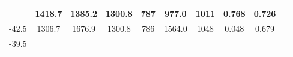 \documentclass[a4paper,12pt]{article}
\begin{document}
\begin{longtable}{
     |
%    
    c|
%    
    c|
%    
    c|
%    
    c|
%    
    c|
%    
    c|
%    
    c|
%    
    c|
%    
    c|
%    
    c|
%    
    }
%        
        & 1418.7
%        

%        

%        
        & 1385.2
%        

%        

%        
        & 1300.8
%        

%        

%        
        & 787
%        

%        

%        
        & 977.0
%        

%        

%        
        & 1011
%        

%        

%        
        & 0.768
%        

%        

%        
        & 0.726
%        

%        
        \\
        \hline

        

%        

%        
        -42.5
%        

%        

%        
        & 1306.7
%        

%        

%        
        & 1676.9
%        

%        

%        
        & 1300.8
%        

%        

%        
        & 786
%        

%        

%        
        & 1564.0
%        

%        

%        
        & 1048
%        

%        

%        
        & 0.048
%        

%        

%        
        & 0.679
%        

%        
        \\
        \hline

        

%        

%        
        -39.5
%        

%        


\end{longtable}
\end{document}
